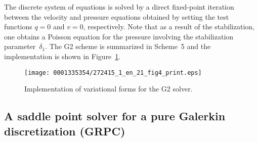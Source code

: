 \renewcommand{\scheme}[3]{%
\begin{figure}
  \center
    \small
    \begin{tabular}{l}
      \toprule
      \textbf{Scheme #1:} #2 \\
      \midrule
  \begin{minipage}{.93\textwidth}
        \vspace{0.1cm}
        \begin{enumerate}
          #3
        \end{enumerate}
        \vspace{0.1cm}
      \end{minipage} \\
      \bottomrule
    \end{tabular}
    \normalsize
\end{figure}}

The discrete system of equations is solved by a direct fixed-point
iteration between the velocity and pressure equations obtained by
setting the test functions $q = 0$ and $v = 0$, respectively. Note that
as a result of the stabilization, one obtains a Poisson equation for
the pressure involving the stabilization parameter~$\delta_1$. The G2
scheme is summarized in Scheme~5 and the implementation is shown in
Figure~\ref{fig:g2_code}.

\begin{figure}[!t]
\centering
\texttt{[image: 0001335354/272415\_1\_en\_21\_fig4\_print.eps]}
\caption{Implementation of variational forms for the G2 solver.}
\label{fig:g2_code}\vspace*{6pt}
\end{figure}

\subsection{A saddle point solver for a pure Galerkin discretization (GRPC)}


